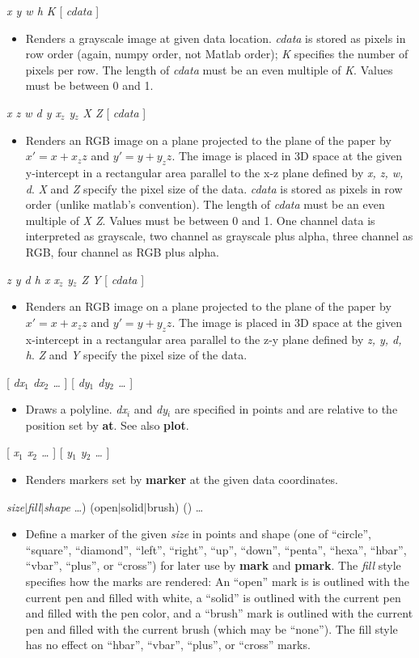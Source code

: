 \documentclass[11pt]{article}
\def\cmd#1#2{\noindent {\bf #1} #2\par}
\def\expl#1{\kern-8pt\begin{itemize}\item[]#1\end{itemize}}
\def\cref#1{{\bf #1}}
\def\bar{{$|$}}
\begin{document}
\cmd{imageg}{\emph{x y w h K} [ \emph{cdata} ]}
\expl{Renders a grayscale image at given data location. \emph{cdata} is
  stored as pixels in row order (again, numpy order, not Matlab order); 
   \emph{K} specifies
  the number of pixels per row. The length of \emph{cdata} must be an
  even multiple of \emph{K}. Values must be between 0 and 1.}

\cmd{xzimage}{\emph{x z w d y x$_z$ y$_z$ X Z} [ \emph{cdata} ]}
\expl{Renders an RGB image on a plane projected to the plane of
  the paper by $x' = x + x_z z$ and $y' = y + y_z z$. The image is
  placed in 3D space at the given y-intercept in a rectangular area
  parallel to the x-z plane defined by \emph{x, z, w, d}. \emph{X} and
  \emph{Z} specify the pixel size of the data. \emph{cdata} is stored
  as pixels in row order (unlike matlab's convention). The length of
  \emph{cdata} must be an even multiple of \emph{X Z}. Values must be
  between 0 and 1. One channel data is interpreted as grayscale, two
  channel as grayscale plus alpha, three channel as RGB, four channel
  as RGB plus alpha.}

\cmd{zyimage}{\emph{z y d h x x$_z$ y$_z$ Z Y} [ \emph{cdata} ]}
\expl{Renders an RGB image on a plane projected to the plane of
  the paper by $x' = x + x_z z$ and $y' = y + y_z z$. The image is
  placed in 3D space at the given x-intercept in a rectangular area
  parallel to the z-y plane defined by \emph{z, y, d, h}. \emph{Z} and
  \emph{Y} specify the pixel size of the data.} 


\cmd{line}{[ \emph{dx$_1$ dx$_2$ \ldots} ] [ \emph{dy$_1$ dy$_2$ \ldots} ]}
\expl{Draws a polyline. \emph{dx$_i$} and \emph{dy$_i$} are specified in
  points and are relative to the position set by \cref{at}. See also
  \cref{plot}.}

\cmd{mark}{[ \emph{x$_1$ x$_2$ \ldots} ] [ \emph{y$_1$ y$_2$ \ldots} ]}
\expl{Renders markers set by \cref{marker} at the given data
  coordinates.}

\cmd{marker}{\emph{size}\bar\emph{fill}\bar\emph{shape} \ldots) (open\bar{}solid\bar{}brush)
  ()
  \ldots}
\expl{Define a marker of the given \emph{size} in points and shape
  (one of
  ``circle'', ``square'', ``diamond'', ``left'', ``right'', ``up'',
  ``down'', ``penta'', ``hexa'', ``hbar'', ``vbar'', ``plus'', or ``cross'')
  for
  later use by \cref{mark} and \cref{pmark}. The \emph{fill} style
  specifies how the marks are rendered: An ``open'' mark  is 
  is outlined with the current pen and filled with white,  a ``solid'' is
  outlined with the current pen and filled with the pen color, and a  ``brush'' mark is outlined  with
  the current pen and filled with the current brush (which may be ``none''). The fill style
  has no effect on ``hbar'', ``vbar'', ``plus'', or ``cross'' marks.}
\end{document}
